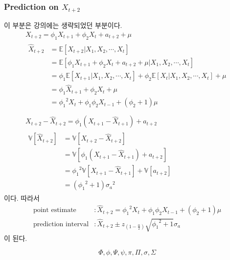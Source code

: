 \documentclass{article}
\newcommand\sa{\ensuremath{{\sigma_a}}}
\begin{document}
\subsubsection{Prediction on \(X_{t+2}\)}
이 부분은 강의에는 생략되었던 부분이다.
\begin{gather*}
X_{t+2}=\phi_1 X_{t+1}+\phi_2X_t+a_{t+2}+\mu\\
\begin{aligned}
\hat X_{t+2}
&=\mathbb E[X_{t+2}|X_1,X_2,\cdots,X_t]\\
&=\mathbb E[\phi_1 X_{t+1}+\phi_2X_t+a_{t+2}+\mu|X_1,X_2,\cdots,X_t]\\
&=\phi_1\mathbb E[X_{t+1}|X_1,X_2,\cdots,X_t]+\phi_2\mathbb E[X_t|X_1,X_2,\cdots,X_t]+\mu\\
&=\phi_1\hat X_{t+1}+\phi_2X_t+\mu\\
&={\phi_1}^2X_t+\phi_1\phi_2X_{t-1}+(\phi_2+1)\mu\\
\end{aligned}\\
X_{t+2}-\hat X_{t+2}=\phi_1\left(X_{t+1}-\hat X_{t+1}\right)+a_{t+2}\\
\begin{aligned}
\mathbb V[\hat X_{t+2}]
&=\mathbb V[X_{t+2}-\hat X_{t+2}]\\
&=\mathbb V[\phi_1\left(X_{t+1}-\hat X_{t+1}\right)+a_{t+2}]\\
&={\phi_1}^2\mathbb V\left[X_{t+1}-\hat X_{t+1}\right]+\mathbb V[a_{t+2}]\\
&=({\phi_1}^2+1)\sa^2
\end{aligned}
\end{gather*}
이다.
따라서
\begin{align*}
\text{point estimate}		&:\hat X_{t+2} = {\phi_1}^2X_t+\phi_1\phi_2X_{t-1}+(\phi_2+1)\mu\\
\text{prediction interval}	&:\hat X_{t+2}\pm z_{(1-\frac\alpha2)}\sqrt{{\phi_1}^2+1}\sa
\end{align*}
이 된다.


\[\Phi, \phi, \Psi, \psi, \pi, \Pi, \sigma, \Sigma\]
\end{document}
